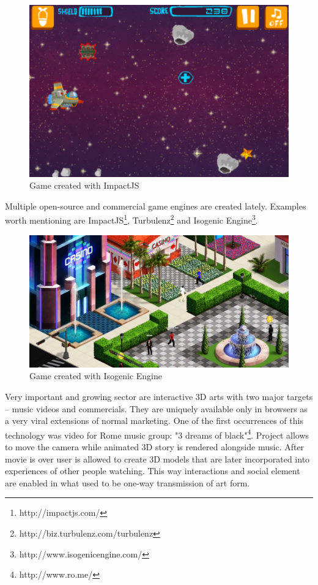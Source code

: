\begin{figure}[h!]
  \caption{Game created with ImpactJS}
  \label{img:impactjs}
  \centering
	\includegraphics[width=12cm]{summary/impactjs.png}
\end{figure}

Multiple open-source and commercial game engines are created lately. Examples worth mentioning are ImpactJS\footnote{http://impactjs.com/}, Turbulenz\footnote{http://biz.turbulenz.com/turbulenz} and Isogenic Engine\footnote{http://www.isogenicengine.com/}.


\begin{figure}[h!]
  \caption{Game created with Isogenic Engine}
  \label{img:isogenic}
  \centering
	\includegraphics[width=12cm]{summary/isogenic.png}
\end{figure}

Very important and growing sector are interactive 3D arts with two major targets -- music videos and commercials. They are uniquely available only in browsers as a very viral extensions of normal marketing. One of the first occurrences of this technology was video for Rome music group: "3 dreams of black"\footnote{http://www.ro.me/}. Project allows to move the camera while animated 3D story is rendered alongside music. After movie is over user is allowed to create 3D models that are later incorporated into experiences of other people watching. This way interactions and social element are enabled in what used to be one-way transmission of art form.

